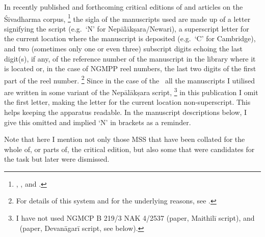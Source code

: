 In recently published and forthcoming critical editions of and articles
on the Śivadharma corpus,%
		 \footnote{, 
						, and .}
the sigla of the manuscripts used are made up of 
a letter signifying the script (e.g.~`N' for
Nepālākṣara/Newari), a superscript letter for the current location where
the manuscript is deposited (e.g.~`C' for Cambridge), 
and two (sometimes only one or even three) subscript 
digits echoing the last digit(s), if any, of the reference 
number of the manuscript in the 
library where it is located or, in the case of NGMPP reel 
numbers, the last two digits of the first part of the reel number.%
			\footnote{For details of this system and for the underlying reasons, see 
								.}
Since in the case of the \VSS\ all the 
manuscripts I utilised are written in
some variant of the Nepālākṣara script,%
		\footnote{I have not used NGMCP B 219/3 
		NAK 4/2537 (paper, Maithilī script), and \msL\
		(paper, Devanāgarī script, see below).} 
in this publication I omit the first letter, 
making the letter for the current location non-superscript. 
This helps keeping the apparatus readable. 
In the manuscript descriptions below, I give this 
omitted and implied `N' in brackets as a reminder.

Note that here I mention not only those MSS that
have been collated for the whole of, or parts of,
the critical edition, but also some that were candidates
for the task but later were dismissed.		




